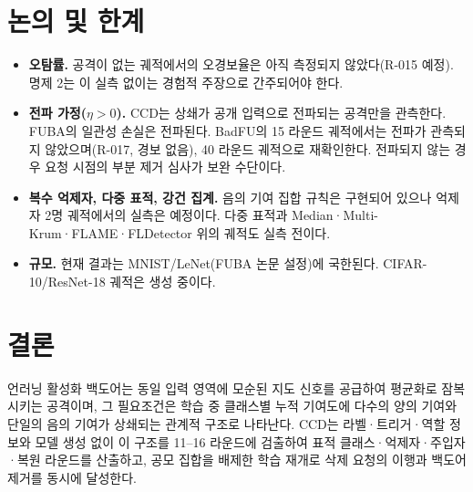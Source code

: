 \documentclass[10pt,a4paper]{article}
\newcommand{\method}{CCD}
\begin{document}
\section{논의 및 한계}\label{sec:limit}
\begin{itemize}
\item \textbf{오탐률.} 공격이 없는 궤적에서의 오경보율은 아직 측정되지 않았다(R-015 예정). 명제 2는 이 실측 없이는 경험적 주장으로 간주되어야 한다.
\item \textbf{전파 가정($\eta>0$).} \method{}는 상쇄가 공개 입력으로 전파되는 공격만을 관측한다. FUBA의 일관성 손실은 전파된다. BadFU의 15 라운드 궤적에서는 전파가 관측되지 않았으며(R-017, 경보 없음), 40 라운드 궤적으로 재확인한다. 전파되지 않는 경우 요청 시점의 부분 제거 심사가 보완 수단이다.
\item \textbf{복수 억제자, 다중 표적, 강건 집계.} 음의 기여 집합 규칙은 구현되어 있으나 억제자 2명 궤적에서의 실측은 예정이다. 다중 표적과 Median·Multi-Krum·FLAME·FLDetector 위의 궤적도 실측 전이다.
\item \textbf{규모.} 현재 결과는 MNIST/LeNet(FUBA 논문 설정)에 국한된다. CIFAR-10/ResNet-18 궤적은 생성 중이다.
\end{itemize}

\section{결론}
언러닝 활성화 백도어는 동일 입력 영역에 모순된 지도 신호를 공급하여 평균화로 잠복시키는 공격이며, 그 필요조건은 학습 중 클래스별 누적 기여도에 다수의 양의 기여와 단일의 음의 기여가 상쇄되는 관계적 구조로 나타난다. \method{}는 라벨·트리거·역할 정보와 모델 생성 없이 이 구조를 11--16 라운드에 검출하여 표적 클래스·억제자·주입자·복원 라운드를 산출하고, 공모 집합을 배제한 학습 재개로 삭제 요청의 이행과 백도어 제거를 동시에 달성한다.
\end{document}
